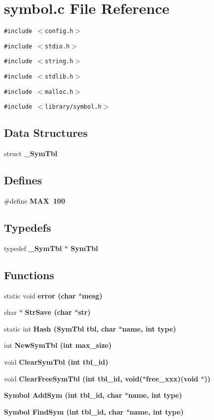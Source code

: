\section{symbol.c File Reference}
\label{symbol_8c}
{\tt \#include $<$config.h$>$}\par
{\tt \#include $<$stdio.h$>$}\par
{\tt \#include $<$string.h$>$}\par
{\tt \#include $<$stdlib.h$>$}\par
{\tt \#include $<$malloc.h$>$}\par
{\tt \#include $<$library/symbol.h$>$}\par
\subsection*{Data Structures}
\begin{CompactItemize}
\item 
struct \bf{\_\-Sym\-Tbl}
\end{CompactItemize}
\subsection*{Defines}
\begin{CompactItemize}
\item 
\#define \bf{MAX}~100
\end{CompactItemize}
\subsection*{Typedefs}
\begin{CompactItemize}
\item 
typedef \bf{\_\-Sym\-Tbl} $\ast$ \bf{Sym\-Tbl}
\end{CompactItemize}
\subsection*{Functions}
\begin{CompactItemize}
\item 
static void \bf{error} (char $\ast$mesg)
\item 
char $\ast$ \bf{Str\-Save} (char $\ast$str)
\item 
static int \bf{Hash} (\bf{Sym\-Tbl} tbl, char $\ast$\bf{name}, int type)
\item 
int \bf{New\-Sym\-Tbl} (int max\_\-size)
\item 
void \bf{Clear\-Sym\-Tbl} (int tbl\_\-id)
\item 
void \bf{Clear\-Free\-Sym\-Tbl} (int tbl\_\-id, void($\ast$free\_\-xxx)(void $\ast$))
\item 
\bf{Symbol} \bf{Add\-Sym} (int tbl\_\-id, char $\ast$\bf{name}, int type)
\item 
\bf{Symbol} \bf{Find\-Sym} (int tbl\_\-id, char $\ast$\bf{name}, int type)
\end{CompactItemize}
